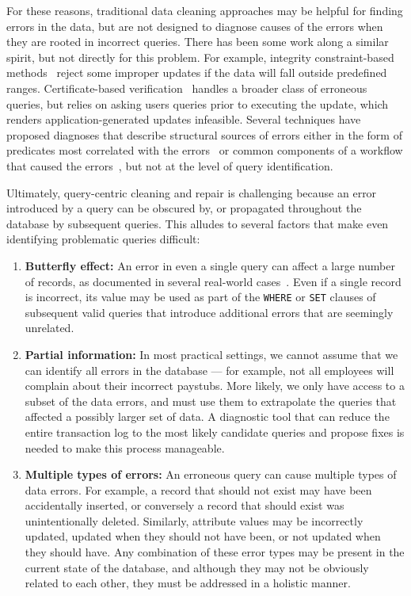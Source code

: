 For these reasons, traditional data cleaning approaches may be helpful for finding errors in the data, but are
not designed to diagnose causes of the errors when they are rooted in incorrect queries.
There has been some work along a similar spirit, but not directly for this problem.  
For example, integrity constraint-based methods~\cite{Khoussainova2006} reject some improper
updates if the data will fall outside predefined ranges.
Certificate-based verification~\cite{Chen2011} handles a broader class of erroneous queries,
but relies on asking users queries prior to executing the update, which renders application-generated
updates infeasible.
Several techniques have proposed diagnoses that describe structural sources of errors
either in the form of predicates most correlated with the errors~\cite{Wu13}
or common components of a workflow that caused the errors~\cite{wang2015}, but not at the level
of query identification.

Ultimately, query-centric cleaning and repair is challenging because an error introduced by a query can be obscured by, or propagated throughout the database
by subsequent queries. This alludes to several factors that make even identifying problematic queries difficult:

\begin{enumerate}[leftmargin=*, topsep=0mm, itemsep=0mm]

  \item \textbf{Butterfly effect: } 
  An error in even a single query can affect a large number of records, as documented in several real-world
  cases~\cite{Yates10, Grady13, sakalerrors}.  Even if a single record is incorrect,
  its value may be used as part of the \texttt{WHERE} or \texttt{SET} clauses of 
  subsequent valid queries that introduce additional errors that are seemingly unrelated.

  \item \textbf{Partial information:} 
   In most practical settings, we cannot assume that we can identify all
  errors in the database --- for example, not all employees will complain about their incorrect paystubs.  
  More likely, we only have access to a subset of the data errors, and must use them to extrapolate 
  the queries that affected a possibly larger set of data.  A diagnostic tool that can reduce
  the entire transaction log to the most likely candidate queries and propose fixes
  is needed to make this process manageable.


  \item \textbf{Multiple types of errors:} 
  An erroneous query can cause multiple types of data errors.  For example, a record that should not exist may have been accidentally inserted, or conversely a record that 
  should exist was unintentionally deleted.  Similarly, attribute values may be incorrectly updated,
  updated when they should not have been, or not updated when they should have.  
  Any combination of these error types may be present in the current state of the database,
  and although they may not be obviously related to each other, they must be addressed in a holistic manner.  

\end{enumerate}

